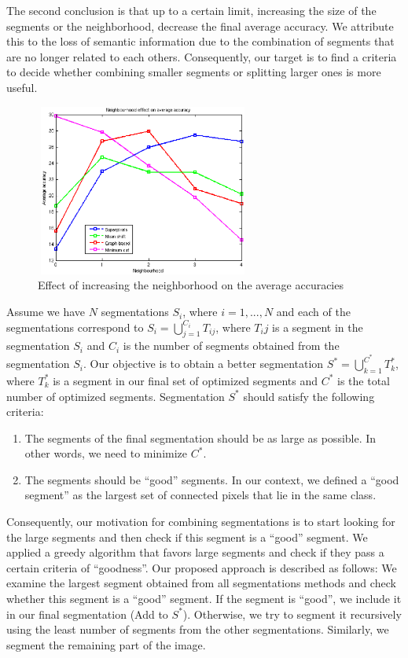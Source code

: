 \documentclass[10pt,twocolumn,letterpaper]{article}
\begin{document}
The second conclusion is that up to a certain limit, increasing the size of the segments or the neighborhood, decrease the final average accuracy.
We attribute this to the loss of semantic information due to the combination of segments that are no longer related to each others.
Consequently, our target is to find a criteria to decide whether combining smaller segments or splitting larger ones is more useful.

\begin{figure}
\includegraphics[width=200pt,height=160pt]{./Figures/neigh_acc.eps}
\centering
\caption{Effect of increasing the neighborhood on the average accuracies}
\label{fig:neigh_effect}
\end{figure}

Assume we have $N$ segmentations $S_i$, where $i = 1, ..., N$ and each of the
segmentations correspond to $S_i = \bigcup_{j=1}^{C_i}T_{ij}$, where $T_ij$ is a
segment in the segmentation $S_i$ and $C_i$ is the number of segments obtained
from the segmentation $S_i$. Our objective is to obtain a better segmentation
$S^* = \bigcup_{k=1}^{C^*}T_k^*$, where $T^*_k$ is a segment in our final set of
optimized segments and $C^*$ is the total number of optimized segments. Segmentation
$S^*$ should satisfy the following criteria:

\begin{enumerate}
\item
The segments of the final segmentation should be as large as possible. In other
words, we need to minimize $C^*$.
\item
The segments should be ``good'' segments. In our context, we defined a ``good
segment'' as the largest set of connected pixels that lie in the same class.
\end{enumerate}

Consequently, our motivation for combining segmentations is to start looking for
the large segments and then check if this segment is a ``good'' segment. We
applied a greedy algorithm that favors large segments and check if they pass a
certain criteria of ``goodness''.
Our proposed approach is described as follows:
We examine the largest segment obtained from all segmentations methods and check whether this segment is a ``good'' segment.
If the segment is ``good'', we include it in our final segmentation (Add to $S^*$).
Otherwise, we try to segment it recursively using the least number of segments from the other segmentations.
Similarly, we segment the remaining part of the image.
\end{document}
